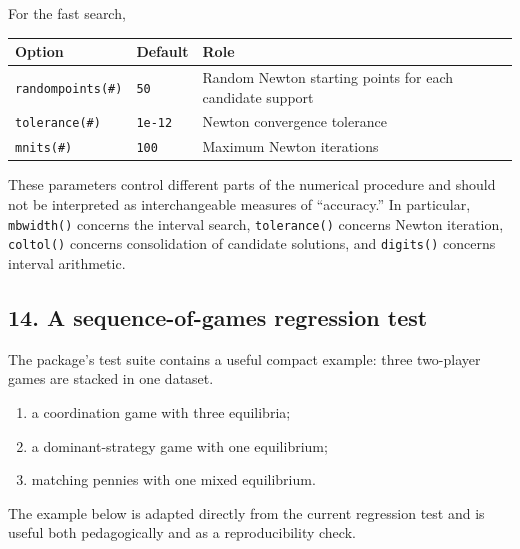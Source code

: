 \documentclass[11pt]{article}
\providecommand{\tightlist}{%
      \setlength{\itemsep}{0pt}\setlength{\parskip}{0pt}}
\begin{document}
For the fast search,

\begin{longtable}[]{@{}
  >{\raggedright\arraybackslash}p{}
  >{\raggedleft\arraybackslash}p{}
  >{\raggedright\arraybackslash}p{}@{}}
\toprule
Option & Default & Role \\
\midrule
\endhead
\texttt{randompoints(\#)} & \texttt{50} & Random Newton starting points
for each candidate support \\
\texttt{tolerance(\#)} & \texttt{1e-12} & Newton convergence
tolerance \\
\texttt{mnits(\#)} & \texttt{100} & Maximum Newton iterations \\
\bottomrule
\end{longtable}

These parameters control different parts of the numerical procedure and
should not be interpreted as interchangeable measures of ``accuracy.''
In particular, \texttt{mbwidth()} concerns the interval search,
\texttt{tolerance()} concerns Newton iteration, \texttt{coltol()}
concerns consolidation of candidate solutions, and \texttt{digits()}
concerns interval arithmetic.

    \hypertarget{a-sequence-of-games-regression-test}{%
\subsection{14. A sequence-of-games regression
test}\label{a-sequence-of-games-regression-test}}

The package's test suite contains a useful compact example: three
two-player games are stacked in one dataset.

\begin{enumerate}
\def\labelenumi{\arabic{enumi}.}
\tightlist
\item
  a coordination game with three equilibria;
\item
  a dominant-strategy game with one equilibrium;
\item
  matching pennies with one mixed equilibrium.
\end{enumerate}

The example below is adapted directly from the current regression test
and is useful both pedagogically and as a reproducibility check.
\end{document}
